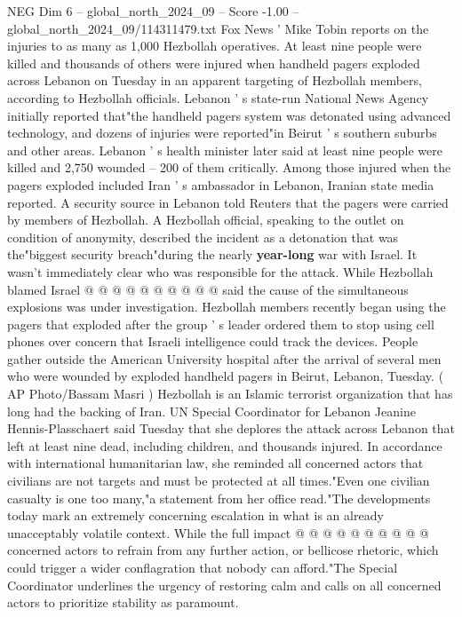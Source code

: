 \begin{textsample}{NEG Dim 6 – global\_north\_2024\_09 – Score -1.00 – global\_north\_2024\_09/114311479.txt}  \label{ex:f6_neg_095}
Fox News ' Mike Tobin reports on the injuries to as many as 1,000 Hezbollah operatives.
At least nine people were killed and thousands of others were injured when handheld pagers exploded across Lebanon on Tuesday in an apparent targeting of Hezbollah members, according to Hezbollah officials.
Lebanon ' s state-run National News Agency initially reported that"the handheld pagers system was detonated using advanced technology, and dozens of injuries were reported"in Beirut ' s southern suburbs and other areas.
Lebanon ' s health minister later said at least nine people were killed and 2,750 wounded -- 200 of them critically.
Among those injured when the pagers exploded included Iran ' s ambassador in Lebanon, Iranian state media reported.
A security source in Lebanon told Reuters that the pagers were carried by members of Hezbollah.
A Hezbollah official, speaking to the outlet on condition of anonymity, described the incident as a detonation that was the"biggest security breach"during the nearly \textbf{year-long} war with Israel.
It wasn't immediately clear who was responsible for the attack.
While Hezbollah blamed Israel @ @ @ @ @ @ @ @ @ @ said the cause of the simultaneous explosions was under investigation.
Hezbollah members recently began using the pagers that exploded after the group ' s leader ordered them to stop using cell phones over concern that Israeli intelligence could track the devices.
People gather outside the American University hospital after the arrival of several men who were wounded by exploded handheld pagers in Beirut, Lebanon, Tuesday. ( AP Photo/Bassam Masri ) Hezbollah is an Islamic terrorist organization that has long had the backing of Iran.
UN Special Coordinator for Lebanon Jeanine Hennis-Plasschaert said Tuesday that she deplores the attack across Lebanon that left at least nine dead, including children, and thousands injured.
In accordance with international humanitarian law, she reminded all concerned actors that civilians are not targets and must be protected at all times."Even one civilian casualty is one too many,"a statement from her office read."The developments today mark an extremely concerning escalation in what is an already unacceptably volatile context.
While the full impact @ @ @ @ @ @ @ @ @ @ concerned actors to refrain from any further action, or bellicose rhetoric, which could trigger a wider conflagration that nobody can afford."The Special Coordinator underlines the urgency of restoring calm and calls on all concerned actors to prioritize stability as paramount.

\end{textsample}
